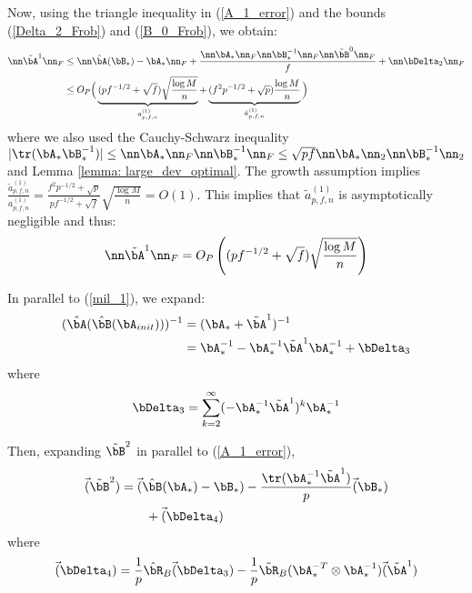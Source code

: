 \begin{IEEEproof}
Now, using the triangle inequality in (\ref{A_1_error}) and the bounds (\ref{Delta_2_Frob}) and (\ref{B_0_Frob}), we obtain:
\begin{align}
	\nn \tilde{\bA}^1 \nn_F &\leq \nn \hat{\bA}(\bB_*)-\bA_* \nn_F + \frac{\nn \bA_*\nn_F \nn \bB_*^{-1}\nn_F \nn \tilde{\bB}^0 \nn_F}{f} + \nn \bDelta_2\nn_F  \nonumber \\
		&\leq O_P\Big( \underbrace{ (pf^{-1/2}+\sqrt{f})\sqrt{\frac{\log M}{n}} }_{a_{p,f,n}^{(1)}} + \underbrace{ (f^2p^{-1/2}+\sqrt{p}) \frac{\log M}{n} }_{\tilde{a}_{p,f,n}^{(1)}} \Big) \label{tilde_A_1_Frob}
\end{align}
where we also used the Cauchy-Schwarz inequality $|\tr(\bA_*\bB_*^{-1})|\leq \nn \bA_*\nn_F \nn \bB_*^{-1}\nn_F \leq \sqrt{pf} \nn \bA_* \nn_2\nn \bB_*^{-1}\nn_2$ and Lemma \ref{lemma: large_dev_optimal}. The growth assumption implies $\frac{\tilde{a}_{p,f,n}^{(1)}}{a_{p,f,n}^{(1)}} = \frac{f^2p^{-1/2}+\sqrt{p}}{pf^{-1/2}+\sqrt{f}} \sqrt{\frac{\log M}{n}} = O(1)$. This implies that $\tilde{a}_{p,f,n}^{(1)}$ is asymptotically negligible and thus:
\begin{equation} \label{A_1_Frob}
	\nn \tilde{\bA}^1 \nn_F = O_P\left( (pf^{-1/2}+\sqrt{f})\sqrt{\frac{\log M}{n}} \right)
\end{equation}


In parallel to (\ref{mil_1}), we expand:
\begin{align}
	(\hat{\bA}(\hat{\bB}(\bA_{init})))^{-1} &= (\bA_* + \tilde{\bA}^1)^{-1} \nonumber \\
		&= \bA_*^{-1} - \bA_*^{-1}\tilde{\bA}^1 \bA_*^{-1} + \bDelta_3  \label{eqq}
\end{align}
where
\begin{equation} \label{Delta_3}
	\bDelta_3 = \sum_{k=2}^\infty (-\bA_*^{-1} \tilde{\bA}^1)^k \bA_*^{-1}
\end{equation}

Then, expanding $\tilde{\bB}^2$ in parallel to (\ref{A_1_error}),
\begin{align}
	\vec(\tilde{\bB}^2) %
		&= \vec(\hat{\bB}(\bA_*)-\bB_*) - \frac{\tr(\bA_*^{-1} \tilde{\bA}^1)}{p} \vec(\bB_*) \nonumber \\
		&\qquad + \vec(\bDelta_4) \label{B_2_error}
\end{align}
where 
\begin{equation} \label{vec_Delta_4}
	\vec(\bDelta_4) = \frac{1}{p} \hat{\bR}_B\vec(\bDelta_3) - \frac{1}{p} \tilde{\bR}_B (\bA_*^{-T}\otimes \bA_*^{-1}) \vec(\tilde{\bA}^1)
\end{equation}


\end{IEEEproof}
